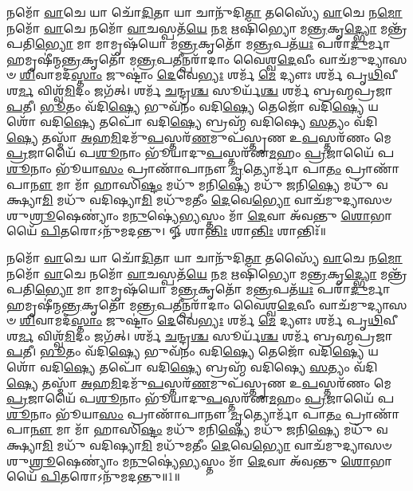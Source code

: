 \setcounter{anuvakam}{0}
𑌨𑌮𑍋᳴ \ul{𑌵𑌾}\-𑌚𑍇 𑌯𑌾 𑌚𑍋᳴\-\ul{𑌦𑌿}\-𑌤𑌾 𑌯𑌾 𑌚𑌾𑌨𑍁᳴𑌦𑌿\-\ul{𑌤𑌾} 𑌤𑌸𑍍𑌯𑍈᳴ \ul{𑌵𑌾}\-𑌚𑍇 𑌨\-\ul{𑌮𑍋} 𑌨𑌮𑍋᳴ \ul{𑌵𑌾}\-𑌚𑍇 𑌨𑌮𑍋᳴ \ul{𑌵𑌾}\-𑌚𑌸𑍍𑌪𑌤᳴\-\ul{𑌯𑍇} 𑌨\-\ul{𑌮} 𑌋𑌷𑌿᳴𑌭𑍍𑌯𑍋 𑌮\-\ul{𑌨𑍍𑌤𑍍𑌰}\-𑌕𑍃\-\ul{𑌦𑍍𑌭𑍍𑌯𑍋} 𑌮𑌨𑍍𑌤𑍍𑌰᳴𑌪𑌤𑌿\-\ul{𑌭𑍍𑌯𑍋} 𑌮𑌾 𑌮𑌾𑌮𑍃𑌷᳴𑌯𑍋 𑌮\-\ul{𑌨𑍍𑌤𑍍𑌰}\-𑌕𑍃𑌤𑍋᳴ 𑌮\-\ul{𑌨𑍍𑌤𑍍𑌰}\-𑌪𑌤᳴\-\ul{𑌯𑌃} 𑌪𑌰𑌾᳴\-\ul{𑌦𑍁}\-𑌰𑍍𑌮𑌾𑌹𑌮𑍃𑌷𑍀॑𑌨𑍍𑌮\-\ul{𑌨𑍍𑌤𑍍𑌰}\-𑌕𑍃𑌤𑍋᳴ 𑌮\-\ul{𑌨𑍍𑌤𑍍𑌰}\-𑌪\-\ul{𑌤𑍀}\-𑌨𑍍𑌪𑌰𑌾᳴𑌦𑌾𑌂 𑌵𑍈𑌶𑍍𑌵\-\ul{𑌦𑍇}\-𑌵𑍀𑌂 𑌵𑌾𑌚᳴𑌮𑍁𑌦𑍍𑌯𑌾𑌸𑍞 \ul{𑌶𑌿}\-𑌵𑌾𑌮𑌦᳴\-\ul{𑌸𑍍𑌤𑌾𑌂} 𑌜𑍁𑌷𑍍𑌟𑌾𑌂॑ \ul{𑌦𑍇}\-𑌵𑍇\-\ul{𑌭𑍍𑌯𑌃} 𑌶𑌰𑍍𑌮᳴ \ul{𑌮𑍇} 𑌦𑍍𑌯𑍗𑌃  𑌶𑌰𑍍𑌮᳴ 𑌪𑍃\-\ul{𑌥𑌿}\-𑌵𑍀 𑌶\-\ul{𑌰𑍍𑌮} 𑌵𑌿𑌶𑍍𑌵᳴\-\ul{𑌮𑌿}\-𑌦𑌂 𑌜𑌗᳴𑌤𑍍। 
𑌶𑌰𑍍𑌮᳴ \ul{𑌚}\-𑌨𑍍𑌦𑍍𑌰\-\ul{𑌶𑍍𑌚} 𑌸𑍂𑌰𑍍𑌯᳴\-\ul{𑌶𑍍𑌚} 𑌶𑌰𑍍𑌮᳴ 𑌬𑍍𑌰𑌹𑍍𑌮𑌪𑍍𑌰𑌜𑌾\-\ul{𑌪}\-𑌤𑍀। 
\-\ul{𑌭𑍂}\-𑌤𑌂 𑌵᳴𑌦𑌿\-\ul{𑌷𑍍𑌯𑍇} 𑌭𑍁𑌵᳴𑌨𑌂 𑌵𑌦𑌿\-\ul{𑌷𑍍𑌯𑍇} 𑌤𑍇𑌜𑍋᳴ 𑌵𑌦𑌿\-\ul{𑌷𑍍𑌯𑍇} 𑌯𑌶𑍋᳴ 𑌵𑌦𑌿\-\ul{𑌷𑍍𑌯𑍇} 𑌤𑌪𑍋᳴ 𑌵𑌦𑌿\-\ul{𑌷𑍍𑌯𑍇} 𑌬𑍍𑌰𑌹𑍍𑌮᳴ 𑌵𑌦𑌿𑌷𑍍𑌯𑍇 \ul{𑌸}\-𑌤𑍍𑌯𑌂 𑌵᳴𑌦𑌿\-\ul{𑌷𑍍𑌯𑍇} 𑌤𑌸𑍍𑌮𑌾᳴ \ul{𑌅}\-𑌹\-\ul{𑌮𑌿}\-𑌦𑌮𑍁᳴\-\ul{𑌪}\-𑌸𑍍𑌤𑌰᳴\-\ul{𑌣}\-𑌮𑍁𑌪᳴𑌸𑍍𑌤𑍃𑌣 𑌉\-\ul{𑌪}\-𑌸𑍍𑌤𑌰᳴𑌣𑌂 𑌮𑍇 \ul{𑌪𑍍𑌰}\-𑌜𑌾𑌯𑍈᳴ 𑌪\-\ul{𑌶𑍂}\-𑌨𑌾𑌂 𑌭𑍂᳴𑌯𑌾𑌦𑍁\-\ul{𑌪}\-𑌸𑍍𑌤𑌰᳴𑌣\-\ul{𑌮}\-𑌹𑌂 \ul{𑌪𑍍𑌰}\-𑌜𑌾𑌯𑍈᳴ 𑌪\-\ul{𑌶𑍂}\-𑌨𑌾𑌂 𑌭𑍂᳴𑌯𑌾\-\ul{𑌸𑌂} 𑌪𑍍𑌰𑌾𑌣𑌾᳴𑌪𑌾𑌨𑍗 \ul{𑌮𑍃}\-𑌤𑍍𑌯𑍋𑌰𑍍𑌮𑌾᳴ 𑌪𑌾\-\ul{𑌤𑌂} 𑌪𑍍𑌰𑌾𑌣𑌾᳴𑌪𑌾\-\ul{𑌨𑍗} 𑌮𑌾 𑌮𑌾᳴ 𑌹𑌾𑌸𑌿\-\ul{𑌷𑍍𑌟𑌂} 𑌮𑌧𑍁᳴ 𑌮𑌨𑌿\-\ul{𑌷𑍍𑌯𑍇} 𑌮𑌧𑍁᳴ 𑌜𑌨𑌿\-\ul{𑌷𑍍𑌯𑍇} 𑌮𑌧𑍁᳴ 𑌵𑌕𑍍𑌷𑍍𑌯𑌾\-\ul{𑌮𑌿} 𑌮𑌧𑍁᳴ 𑌵𑌦𑌿𑌷𑍍𑌯𑌾\-\ul{𑌮𑌿} 𑌮𑌧𑍁᳴𑌮𑌤𑍀𑌂 \ul{𑌦𑍇}\-𑌵𑍇\-\ul{𑌭𑍍𑌯𑍋} 𑌵𑌾𑌚᳴𑌮𑍁𑌦𑍍𑌯𑌾𑌸𑍞 𑌶𑍁\-\ul{𑌶𑍍𑌰𑍂}\-𑌷𑍇𑌣𑍍𑌯𑌾𑌂॑ 𑌮\-\ul{𑌨𑍁}\-𑌷𑍍𑌯𑍇॑\-\ul{𑌭𑍍𑌯}\-𑌸𑍍𑌤𑌂 𑌮𑌾᳴ \ul{𑌦𑍇}\-𑌵𑌾 𑌅᳴𑌵𑌨𑍍𑌤𑍁 \ul{𑌶𑍋}\-𑌭𑌾𑌯𑍈᳴ \ul{𑌪𑌿}\-𑌤𑌰𑍋𑌽𑌨𑍁᳴𑌮𑌦𑌨𑍍𑌤𑍁। 
𑍐 𑌶𑌾\-\ul{𑌨𑍍𑌤𑌿𑌃} 𑌶𑌾\-\ul{𑌨𑍍𑌤𑌿𑌃} 𑌶𑌾𑌨𑍍𑌤𑌿𑌃᳴॥ 

𑌨𑌮𑍋᳴ \ul{𑌵𑌾}\-𑌚𑍇 𑌯𑌾 𑌚𑍋᳴\-\ul{𑌦𑌿}\-𑌤𑌾 𑌯𑌾 𑌚𑌾𑌨𑍁᳴𑌦𑌿\-\ul{𑌤𑌾} 𑌤𑌸𑍍𑌯𑍈᳴ \ul{𑌵𑌾}\-𑌚𑍇 𑌨\-\ul{𑌮𑍋} 𑌨𑌮𑍋᳴ \ul{𑌵𑌾}\-𑌚𑍇 𑌨𑌮𑍋᳴ \ul{𑌵𑌾}\-𑌚𑌸𑍍𑌪𑌤᳴\-\ul{𑌯𑍇} 𑌨\-\ul{𑌮} 𑌋𑌷𑌿᳴𑌭𑍍𑌯𑍋 𑌮\-\ul{𑌨𑍍𑌤𑍍𑌰}\-𑌕𑍃\-\ul{𑌦𑍍𑌭𑍍𑌯𑍋} 𑌮𑌨𑍍𑌤𑍍𑌰᳴𑌪𑌤𑌿\-\ul{𑌭𑍍𑌯𑍋} 𑌮𑌾 𑌮𑌾𑌮𑍃𑌷᳴𑌯𑍋 𑌮\-\ul{𑌨𑍍𑌤𑍍𑌰}\-𑌕𑍃𑌤𑍋᳴ 𑌮\-\ul{𑌨𑍍𑌤𑍍𑌰}\-𑌪𑌤᳴\-\ul{𑌯𑌃} 𑌪𑌰𑌾᳴\-\ul{𑌦𑍁}\-𑌰𑍍𑌮𑌾𑌹𑌮𑍃𑌷𑍀॑𑌨𑍍𑌮\-\ul{𑌨𑍍𑌤𑍍𑌰}\-𑌕𑍃𑌤𑍋᳴ 𑌮\-\ul{𑌨𑍍𑌤𑍍𑌰}\-𑌪\-\ul{𑌤𑍀}\-𑌨𑍍𑌪𑌰𑌾᳴𑌦𑌾𑌂 𑌵𑍈𑌶𑍍𑌵\-\ul{𑌦𑍇}\-𑌵𑍀𑌂 𑌵𑌾𑌚᳴𑌮𑍁𑌦𑍍𑌯𑌾𑌸𑍞 \ul{𑌶𑌿}\-𑌵𑌾𑌮𑌦᳴\-\ul{𑌸𑍍𑌤𑌾𑌂} 𑌜𑍁𑌷𑍍𑌟𑌾𑌂॑ \ul{𑌦𑍇}\-𑌵𑍇\-\ul{𑌭𑍍𑌯𑌃} 𑌶𑌰𑍍𑌮᳴ \ul{𑌮𑍇} 𑌦𑍍𑌯𑍗𑌃  𑌶𑌰𑍍𑌮᳴ 𑌪𑍃\-\ul{𑌥𑌿}\-𑌵𑍀 𑌶\-\ul{𑌰𑍍𑌮} 𑌵𑌿𑌶𑍍𑌵᳴\-\ul{𑌮𑌿}\-𑌦𑌂 𑌜𑌗᳴𑌤𑍍। 
𑌶𑌰𑍍𑌮᳴ \ul{𑌚}\-𑌨𑍍𑌦𑍍𑌰\-\ul{𑌶𑍍𑌚} 𑌸𑍂𑌰𑍍𑌯᳴\-\ul{𑌶𑍍𑌚} 𑌶𑌰𑍍𑌮᳴ 𑌬𑍍𑌰𑌹𑍍𑌮𑌪𑍍𑌰𑌜𑌾\-\ul{𑌪}\-𑌤𑍀। 
\-\ul{𑌭𑍂}\-𑌤𑌂 𑌵᳴𑌦𑌿\-\ul{𑌷𑍍𑌯𑍇} 𑌭𑍁𑌵᳴𑌨𑌂 𑌵𑌦𑌿\-\ul{𑌷𑍍𑌯𑍇} 𑌤𑍇𑌜𑍋᳴ 𑌵𑌦𑌿\-\ul{𑌷𑍍𑌯𑍇} 𑌯𑌶𑍋᳴ 𑌵𑌦𑌿\-\ul{𑌷𑍍𑌯𑍇} 𑌤𑌪𑍋᳴ 𑌵𑌦𑌿\-\ul{𑌷𑍍𑌯𑍇} 𑌬𑍍𑌰𑌹𑍍𑌮᳴ 𑌵𑌦𑌿𑌷𑍍𑌯𑍇 \ul{𑌸}\-𑌤𑍍𑌯𑌂 𑌵᳴𑌦𑌿\-\ul{𑌷𑍍𑌯𑍇} 𑌤𑌸𑍍𑌮𑌾᳴ \ul{𑌅}\-𑌹\-\ul{𑌮𑌿}\-𑌦𑌮𑍁᳴\-\ul{𑌪}\-𑌸𑍍𑌤𑌰᳴\-\ul{𑌣}\-𑌮𑍁𑌪᳴𑌸𑍍𑌤𑍃𑌣 𑌉\-\ul{𑌪}\-𑌸𑍍𑌤𑌰᳴𑌣𑌂 𑌮𑍇 \ul{𑌪𑍍𑌰}\-𑌜𑌾𑌯𑍈᳴ 𑌪\-\ul{𑌶𑍂}\-𑌨𑌾𑌂 𑌭𑍂᳴𑌯𑌾𑌦𑍁\-\ul{𑌪}\-𑌸𑍍𑌤𑌰᳴𑌣\-\ul{𑌮}\-𑌹𑌂 \ul{𑌪𑍍𑌰}\-𑌜𑌾𑌯𑍈᳴ 𑌪\-\ul{𑌶𑍂}\-𑌨𑌾𑌂 𑌭𑍂᳴𑌯𑌾\-\ul{𑌸𑌂} 𑌪𑍍𑌰𑌾𑌣𑌾᳴𑌪𑌾𑌨𑍗 \ul{𑌮𑍃}\-𑌤𑍍𑌯𑍋𑌰𑍍𑌮𑌾᳴ 𑌪𑌾\-\ul{𑌤𑌂} 𑌪𑍍𑌰𑌾𑌣𑌾᳴𑌪𑌾\-\ul{𑌨𑍗} 𑌮𑌾 𑌮𑌾᳴ 𑌹𑌾𑌸𑌿\-\ul{𑌷𑍍𑌟𑌂} 𑌮𑌧𑍁᳴ 𑌮𑌨𑌿\-\ul{𑌷𑍍𑌯𑍇} 𑌮𑌧𑍁᳴ 𑌜𑌨𑌿\-\ul{𑌷𑍍𑌯𑍇} 𑌮𑌧𑍁᳴ 𑌵𑌕𑍍𑌷𑍍𑌯𑌾\-\ul{𑌮𑌿} 𑌮𑌧𑍁᳴ 𑌵𑌦𑌿𑌷𑍍𑌯𑌾\-\ul{𑌮𑌿} 𑌮𑌧𑍁᳴𑌮𑌤𑍀𑌂 \ul{𑌦𑍇}\-𑌵𑍇\-\ul{𑌭𑍍𑌯𑍋} 𑌵𑌾𑌚᳴𑌮𑍁𑌦𑍍𑌯𑌾𑌸𑍞 𑌶𑍁\-\ul{𑌶𑍍𑌰𑍂}\-𑌷𑍇𑌣𑍍𑌯𑌾𑌂॑ 𑌮\-\ul{𑌨𑍁}\-𑌷𑍍𑌯𑍇॑\-\ul{𑌭𑍍𑌯}\-𑌸𑍍𑌤𑌂 𑌮𑌾᳴ \ul{𑌦𑍇}\-𑌵𑌾 𑌅᳴𑌵𑌨𑍍𑌤𑍁 \ul{𑌶𑍋}\-𑌭𑌾𑌯𑍈᳴ \ul{𑌪𑌿}\-𑌤𑌰𑍋𑌽𑌨𑍁᳴𑌮𑌦𑌨𑍍𑌤𑍁॥1॥\anuvakamend

